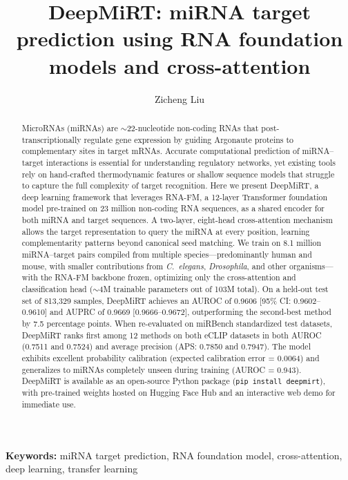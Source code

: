 \documentclass[10pt,a4paper]{article}
\title{\textbf{DeepMiRT: miRNA target prediction using RNA foundation models and cross-attention}}
\author{Zicheng Liu}
\date{}
\begin{document}
\maketitle

\begin{abstract}
MicroRNAs (miRNAs) are $\sim$22-nucleotide non-coding RNAs that post-transcriptionally regulate gene expression by guiding Argonaute proteins to complementary sites in target mRNAs. Accurate computational prediction of miRNA--target interactions is essential for understanding regulatory networks, yet existing tools rely on hand-crafted thermodynamic features or shallow sequence models that struggle to capture the full complexity of target recognition. Here we present DeepMiRT, a deep learning framework that leverages RNA-FM, a 12-layer Transformer foundation model pre-trained on 23 million non-coding RNA sequences, as a shared encoder for both miRNA and target sequences. A two-layer, eight-head cross-attention mechanism allows the target representation to query the miRNA at every position, learning complementarity patterns beyond canonical seed matching. We train on 8.1 million miRNA--target pairs compiled from multiple species---predominantly human and mouse, with smaller contributions from \textit{C.\ elegans}, \textit{Drosophila}, and other organisms---with the RNA-FM backbone frozen, optimizing only the cross-attention and classification head ($\sim$4M trainable parameters out of 103M total). On a held-out test set of 813{,}329 samples, DeepMiRT achieves an AUROC of 0.9606 [95\% CI: 0.9602--0.9610] and AUPRC of 0.9669 [0.9666--0.9672], outperforming the second-best method by 7.5 percentage points. When re-evaluated on miRBench standardized test datasets, DeepMiRT ranks first among 12 methods on both eCLIP datasets in both AUROC (0.7511 and 0.7524) and average precision (APS: 0.7850 and 0.7947). The model exhibits excellent probability calibration (expected calibration error = 0.0064) and generalizes to miRNAs completely unseen during training (AUROC = 0.943). DeepMiRT is available as an open-source Python package (\texttt{pip install deepmirt}), with pre-trained weights hosted on Hugging Face Hub and an interactive web demo for immediate use.
\end{abstract}

\vspace{0.5em}
\noindent\textbf{Keywords:} miRNA target prediction, RNA foundation model, cross-attention, deep learning, transfer learning
\end{document}
